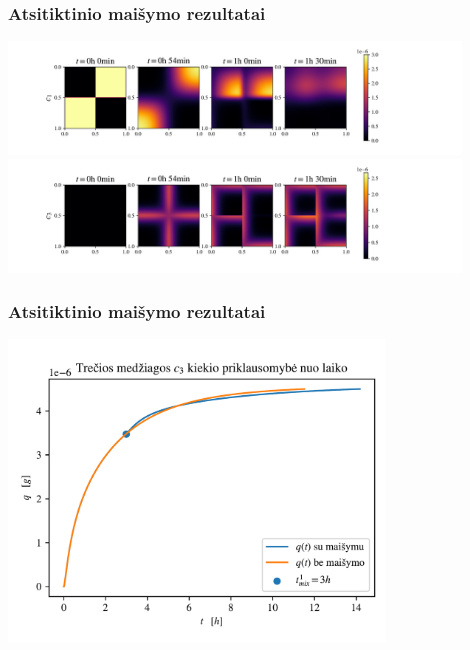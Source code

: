\documentclass{beamer}
\begin{document}
\begin{frame}
    \frametitle{Atsitiktinio maišymo rezultatai}
    \centering
    \includegraphics[width=12cm]{paper/assets/random-mix-example-c0-1.png} \\
    \includegraphics[width=12cm]{paper/assets/random-mix-example-c2-1.png}
\end{frame}

\begin{frame}
    \frametitle{Atsitiktinio maišymo rezultatai}
    \centering
    \includegraphics[width=10cm]{paper/assets/bad-mix-qnt-compare-1.png}
\end{frame}
\end{document}
